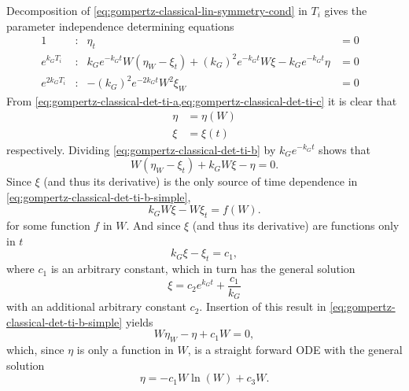 Decomposition of \cref{eq:gompertz-classical-lin-symmetry-cond} in \(T_i\) gives the parameter independence determining equations
\begin{subequations}
  \begin{flalign}
    1 & : & \eta_t &= 0 &\label{eq:gompertz-classical-det-ti-a}\\
    e^{k_G T_i} & : & k_G e^{-k_G t} W \left(\eta_W - \xi_t\right) + (k_G)^2 e^{-k_G t} W \xi - k_G e^{-k_G t} \eta &= 0 &\label{eq:gompertz-classical-det-ti-b}\\
    e^{2 k_G T_i} & : & -(k_G)^2 e^{-2 k_G t} W^2 \xi_W &= 0 &\label{eq:gompertz-classical-det-ti-c}
  \end{flalign}
\end{subequations}
From \cref{eq:gompertz-classical-det-ti-a,eq:gompertz-classical-det-ti-c} it is clear that
\begin{align*}
  \eta &= \eta(W) \\
  \xi &= \xi(t)
\end{align*}
respectively.
Dividing \cref{eq:gompertz-classical-det-ti-b} by \(k_G e^{-k_G t}\) shows that
\begin{equation}\label{eq:gompertz-classical-det-ti-b-simple}
  W \left(\eta_W - \xi_t\right) + k_G W \xi - \eta = 0.
\end{equation}
Since \(\xi\) (and thus its derivative) is the only source of time dependence in \cref{eq:gompertz-classical-det-ti-b-simple},
\begin{equation*}
  k_G W \xi - W \xi_t = f(W).
\end{equation*}
for some function \(f\) in \(W\).
And since \(\xi\) (and thus its derivative) are functions only in \(t\)
\begin{equation*}
  k_G \xi - \xi_t = c_1,
\end{equation*}
where \(c_1\) is an arbitrary constant, which in turn has the general solution
\begin{equation*}
  \xi = c_2 e^{k_G t} + \frac{c_1}{k_G}
\end{equation*}
with an additional arbitrary constant \(c_2\).
Insertion of this result in \cref{eq:gompertz-classical-det-ti-b-simple} yields
\begin{equation*}
  W \eta_W - \eta + c_1 W = 0,
\end{equation*}
which, since \(\eta\) is only a function in \(W\), is a straight forward ODE with the general solution
\begin{equation*}
  \eta = -c_1 W \ln(W) + c_3 W.
\end{equation*}
